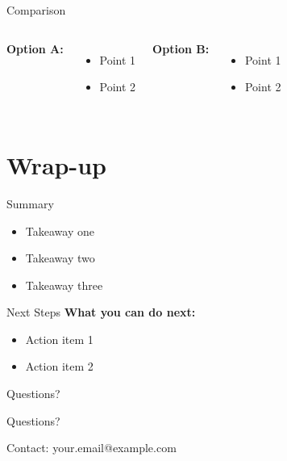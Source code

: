 \documentclass{beamer}
\begin{document}
\begin{frame}{Comparison}
    \begin{columns}
        \textbf{Option A:}
        \begin{itemize}
            \item Point 1
            \item Point 2
        \end{itemize}

        \textbf{Option B:}
        \begin{itemize}
            \item Point 1
            \item Point 2
        \end{itemize}
    \end{columns}
\end{frame}

\section{Wrap-up}

\begin{frame}{Summary}
    \begin{itemize}
        \item Takeaway one
        \item Takeaway two
        \item Takeaway three
    \end{itemize}
\end{frame}

\begin{frame}{Next Steps}
    \textbf{What you can do next:}
    \begin{itemize}
        \item Action item 1
        \item Action item 2
    \end{itemize}
\end{frame}

\begin{frame}{Questions?}
    \begin{center}
        \Large
        Questions?

        \vspace{2em}
        \normalsize
        Contact: your.email@example.com
    \end{center}
\end{frame}
\end{document}
